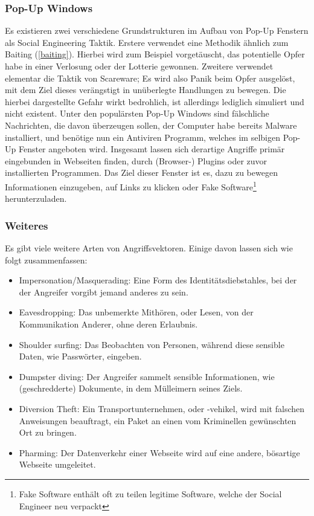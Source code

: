 \subsubsection{Pop-Up Windows}
Es existieren zwei verschiedene Grundstrukturen im Aufbau von Pop-Up Fenstern als Social Engineering Taktik. Erstere verwendet eine Methodik ähnlich zum Baiting (\autoref{baiting}).
Hierbei wird zum Beispiel vorgetäuscht, das potentielle Opfer habe in einer Verlosung oder der Lotterie gewonnen.
Zweitere verwendet elementar die Taktik von Scareware; Es wird also Panik beim Opfer ausgelöst, mit dem Ziel dieses verängstigt in unüberlegte Handlungen zu bewegen. Die hierbei
dargestellte Gefahr wirkt bedrohlich, ist allerdings lediglich simuliert und nicht existent. Unter den populärsten Pop-Up Windows sind fälschliche Nachrichten, die davon
überzeugen sollen, der Computer habe bereits Malware installiert, und benötige nun ein Antiviren Programm, welches im selbigen Pop-Up Fenster angeboten wird.
Insgesamt lassen sich derartige Angriffe primär eingebunden in Webseiten finden, durch (Browser-) Plugins oder
zuvor installierten Programmen. Das Ziel dieser Fenster ist es, dazu zu bewegen Informationen einzugeben, auf Links zu klicken oder Fake Software\footnote{Fake Software enthält oft zu teilen legitime Software, welche der Social Engineer neu verpackt} herunterzuladen.

\subsubsection{Weiteres}
Es gibt viele weitere Arten von Angriffsvektoren. Einige davon lassen sich wie folgt zusammenfassen:

\begin{itemize}
    \setlength\itemsep{-1em}
    \item Impersonation/Masquerading: Eine Form des Identitätsdiebstahles, bei der der Angreifer vorgibt jemand anderes zu sein.
    \item Eavesdropping: Das unbemerkte Mithören, oder Lesen, von der Kommunikation Anderer, ohne deren Erlaubnis.
    \item Shoulder surfing: Das Beobachten von Personen, während diese sensible Daten, wie Passwörter, eingeben.
    \item Dumpster diving: Der Angreifer sammelt sensible Informationen, wie (geschredderte) Dokumente, in dem Mülleimern seines Ziels.
    \item Diversion Theft: Ein Transportunternehmen, oder -vehikel, wird mit falschen Anweisungen beauftragt, ein Paket an einen vom Kriminellen gewünschten Ort zu bringen.
    \item Pharming: Der Datenverkehr einer Webseite wird auf eine andere, bösartige Webseite umgeleitet.
\end{itemize}

